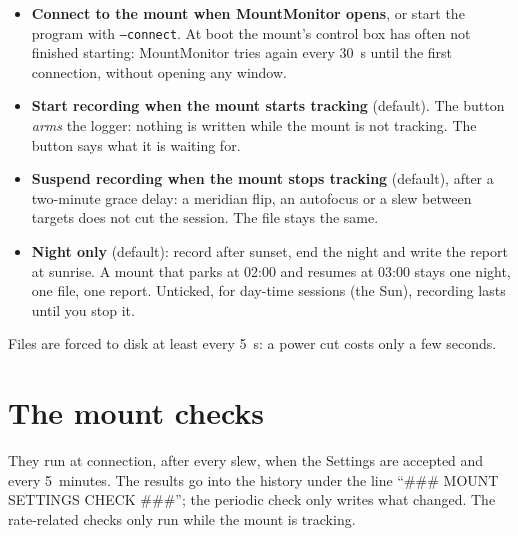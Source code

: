 \begin{itemize}
  \item \textbf{Connect to the mount when MountMonitor opens}, or start the
  program with \texttt{--connect}. At boot the mount's control box has often not
  finished starting: MountMonitor tries again every 30~s until the first
  connection, without opening any window.
  \item \textbf{Start recording when the mount starts tracking} (default). The
  button \emph{arms} the logger: nothing is written while the mount is not
  tracking. The button says what it is waiting for.
  \item \textbf{Suspend recording when the mount stops tracking} (default),
  after a two-minute grace delay: a meridian flip, an autofocus or a slew
  between targets does not cut the session. The file stays the same.
  \item \textbf{Night only} (default): record after sunset, end the night and
  write the report at sunrise. A mount that parks at 02:00 and resumes at 03:00
  stays one night, one file, one report. Unticked, for day-time sessions (the
  Sun), recording lasts until you stop it.
\end{itemize}

Files are forced to disk at least every 5~s: a power cut costs only a few
seconds.

\chapter{The mount checks}
\label{ch:checks}

They run at connection, after every slew, when the Settings are accepted and
every 5~minutes. The results go into the history under the line ``\#\#\# MOUNT
SETTINGS CHECK \#\#\#''; the periodic check only writes what changed. The
rate-related checks only run while the mount is tracking.

